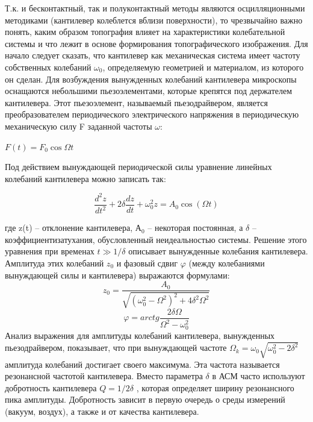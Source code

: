 \documentclass[a4paper,12pt]{article}
\renewcommand{\phi}{\ensuremath{\varphi}}
\theoremstyle{plain} %
\theoremstyle{definition} %
\theoremstyle{remark} %
\begin{document}
\begin{itemize}
Т.к. и бесконтактный, так и полуконтактный методы являются осцилляционными методиками (кантилевер колеблется вблизи поверхности), то чрезвычайно важно понять, каким образом топография влияет на характеристики колебательной системы и что лежит в основе формирования топографического изображения.  Для начало следует сказать, что кантилевер как механическая система имеет частоту собственных колебаний $ \omega_0 $, определяемую геометрией и материалом, из которого он сделан. Для возбуждения вынужденных колебаний кантилевера микроскопы оснащаются небольшими пьезоэлементами, которые крепятся под держателем кантилевера. Этот пьезоэлемент, называемый пьезодрайвером, является преобразователем периодического электрического напряжения в периодическую механическую силу F заданной частоты $ \omega $: 

$ F(t)=F_0\cos{\Omega t} $

Под действием вынуждающей периодической силы уравнение линейных колебаний кантилевера можно записать так: 

\begin{equation}\label{key}
	\frac{d^2z}{dt^2}+2\delta\frac{dz}{dt}+\omega_0^2z=A_0\cos(\Omega t)
\end{equation}

где z(t) – отклонение кантилевера, $ А_0 $ – некоторая постоянная, а $ \delta $ – коэффициентизатухания, обусловленный неидеальностью системы. Решение этого уравнения при временах $ t \gg 1/\delta $ описывает вынужденные колебания кантилевера. Амплитуда этих колебаний $ z_0 $ и фазовый сдвиг $ \phi $ (между колебаниями вынуждающей силы и кантилевера) выражаются формулами:
\begin{equation}\label{key}
	z_0=\frac{A_0}{\sqrt{(\omega_0^2-\Omega^2)^2+4\delta^2\Omega^2}}
\end{equation}
\begin{equation}\label{key}
	\phi=arctg\frac{2\delta\Omega}{\Omega^2-\omega_0^2}
\end{equation}
Анализ выражения для амплитуды колебаний кантилевера, вынужденных
пьезодрайвером, показывает, что при вынуждающей частоте $ \Omega_k=\omega_0\sqrt{\omega_0^2-2\delta^2} $амплитуда колебаний достигает своего максимума. Эта частота называется резонансной частотой кантилевера. Вместо параметра $ \delta $ в АСМ часто используют добротность кантилевера $ Q =1/2\delta $ , которая определяет ширину резонансного пика амплитуды. Добротность зависит в первую очередь о среды измерений (вакуум, воздух), а также и от качества кантилевера. 



\end{itemize}
\end{document}
